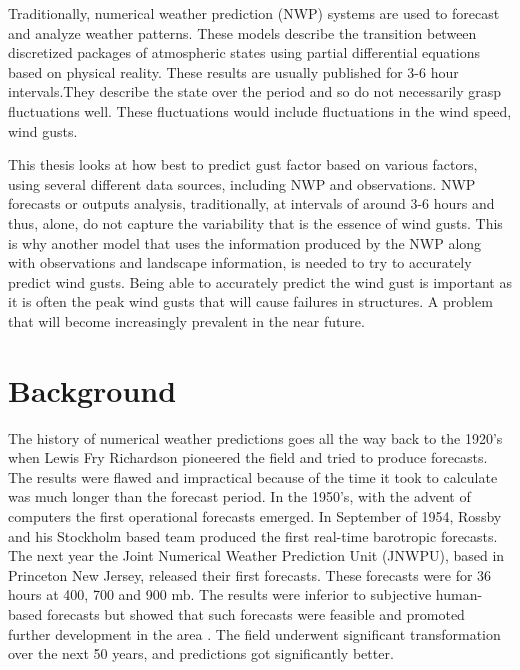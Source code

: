Traditionally, numerical weather prediction (NWP) systems are used to forecast and analyze weather patterns\cite{medium_range_3d_weather_forecasting_NN}. These models describe the transition between discretized packages of atmospheric states using partial differential equations based on physical reality. These results are usually published for 3-6 hour intervals.They describe the state over the period and so do not necessarily grasp fluctuations well. These fluctuations would include fluctuations in the wind speed, wind gusts\cite{canNNBeatNWP}.

This thesis looks at how best to predict gust factor based on various factors, using several different data sources, including NWP and observations. NWP forecasts or outputs analysis, traditionally, at intervals of around 3-6 hours and thus, alone, do not capture the variability that is the essence of wind gusts. This is why another model that uses the information produced by the NWP along with observations and landscape information, is needed to try to accurately predict wind gusts. Being able to accurately predict the wind gust is important as it is often the peak wind gusts that will cause failures in structures. A problem that will become increasingly prevalent in the near future\cite{nasa_extreme_weather}.

\section{Background}
The history of numerical weather predictions goes all the way back to the 1920's when Lewis Fry Richardson pioneered the field and tried to produce forecasts. The results were flawed and impractical because of the time it took to calculate was much longer than the forecast period. In the 1950's, with the advent of computers the first operational forecasts emerged. In September of 1954, Rossby and his Stockholm based team produced the first real-time barotropic forecasts. The next year the Joint Numerical Weather Prediction Unit (JNWPU), based in Princeton New Jersey, released their first forecasts. These forecasts were for 36 hours at 400, 700 and 900 mb. The results were inferior to subjective human-based forecasts but showed that such forecasts were feasible and promoted further development in the area \cite{historyNWP}. The field underwent significant transformation over the next 50 years, and predictions got significantly better.

